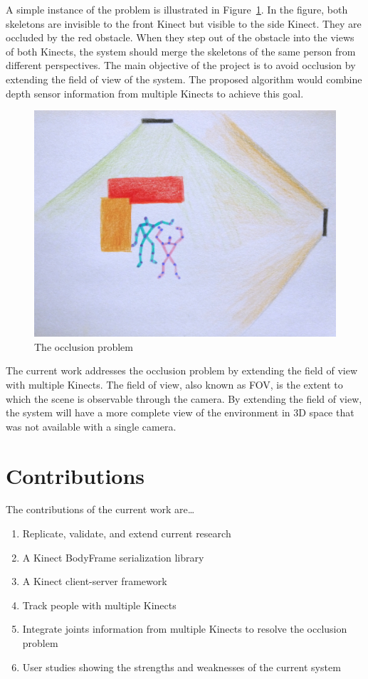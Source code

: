 A simple instance of the problem is illustrated in Figure~\ref{fig:occlusion_problem}. In the figure, both skeletons are invisible to the front Kinect but visible to the side Kinect. They are occluded by the red obstacle. When they step out of the obstacle into the views of both Kinects, the system should merge the skeletons of the same person from different perspectives. The main objective of the project is to avoid occlusion by extending the field of view of the system. The proposed algorithm would combine depth sensor information from multiple Kinects to achieve this goal.

\begin{figure}[!h]
  \centering
  \includegraphics[width=0.8\linewidth]{figs/occlusion_problem}
  \caption{The occlusion problem}
  \label{fig:occlusion_problem}
\end{figure}

The current work addresses the occlusion problem by extending the field of view with multiple Kinects. The field of view, also known as FOV, is the extent to which the scene is observable through the camera. By extending the field of view, the system will have a more complete view of the environment in 3D space that was not available with a single camera.

\section{Contributions}
\label{sec:introduction_contributions}

The contributions of the current work are\ldots

\begin{enumerate}
  \item Replicate, validate, and extend current research
  \item A Kinect BodyFrame serialization library
  \item A Kinect client-server framework
  \item Track people with multiple Kinects
  \item Integrate joints information from multiple Kinects to resolve the occlusion problem
  \item User studies showing the strengths and weaknesses of the current system
\end{enumerate}

